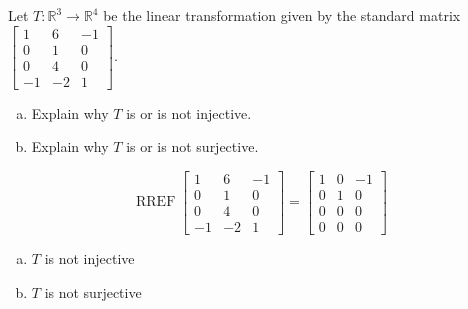 
\begin{exerciseStatement}
 Let \(T:\mathbb{R}^ 3  \to \mathbb{R}^ 4 \) be the linear transformation given by the standard matrix \( \left[\begin{array}{ccc}
1 & 6 & -1 \\
0 & 1 & 0 \\
0 & 4 & 0 \\
-1 & -2 & 1
\end{array}\right] .\)
\begin{enumerate}[(a)]
\item Explain why \(T\) is or is not injective.
\item Explain why \(T\) is or is not surjective.
\end{enumerate}
    
\end{exerciseStatement}
    
\begin{exerciseAnswer} 


\[\operatorname{RREF} \left[\begin{array}{ccc}
1 & 6 & -1 \\
0 & 1 & 0 \\
0 & 4 & 0 \\
-1 & -2 & 1
\end{array}\right] = \left[\begin{array}{ccc}
1 & 0 & -1 \\
0 & 1 & 0 \\
0 & 0 & 0 \\
0 & 0 & 0
\end{array}\right] \]


\begin{enumerate}[(a)]
\item \(T\) is not injective
\item \(T\) is not surjective
\end{enumerate}
    
\end{exerciseAnswer}
    
